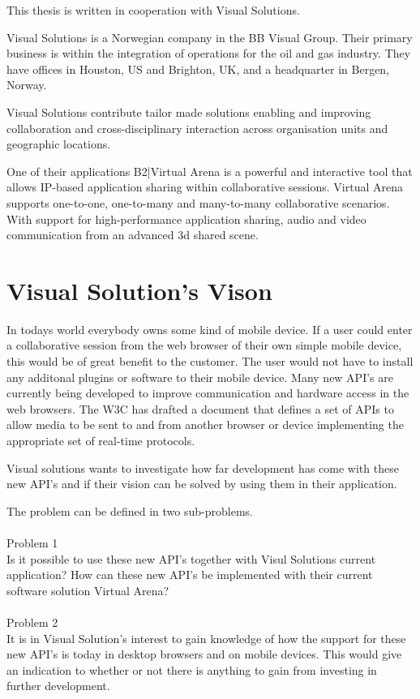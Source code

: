 
This thesis is written in cooperation with Visual Solutions.

Visual Solutions is a Norwegian company in the BB Visual Group. Their primary business is within the integration of operations for the oil and gas industry. They have offices in Houston, US and Brighton, UK, and a headquarter in Bergen, Norway.

Visual Solutions contribute tailor made solutions enabling and improving collaboration and cross-disciplinary interaction across organisation units and geographic locations.

One of their applications B2|Virtual Arena is a powerful and interactive tool that allows IP-based application sharing within collaborative sessions. Virtual Arena supports one-to-one, one-to-many and many-to-many collaborative scenarios. With support for high-performance application sharing, audio and video communication from an advanced 3d shared scene.

\section{Visual Solution's Vison}
In todays world everybody owns some kind of mobile device. If a user could enter a collaborative session from the web browser of their own simple mobile device, this would be of great benefit to the customer. The user would not have to install any additonal plugins or software to their mobile device. Many new API's are currently being developed to improve communication and hardware access in the web browsers. The \ac{W3C} has drafted a document that defines a set of APIs to allow media to be sent to and from another browser or device implementing the appropriate set of real-time protocols.

Visual solutions wants to investigate how far development has come with these new API's and if their vision can be solved by using them in their application.

The problem can be defined in two sub-problems.
\\
\\
Problem 1\\
Is it possible to use these new API's together with Visul Solutions current application? How can these new API's be implemented with their current software solution Virtual Arena?
\\
\\
Problem 2\\
It is in Visual Solution's interest to gain knowledge of how the support for these new API's is today in desktop browsers and on mobile devices. This would give an indication to whether or not there is anything to gain from investing in further development.
